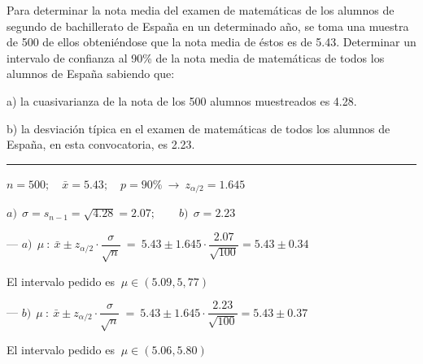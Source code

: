 \vspace{1cm} %
\begin{ejemplo}
\begin{ejre}
Para determinar la nota media del examen de matemáticas de los alumnos de segundo de bachillerato de España en un determinado año, se toma una muestra de 500 de ellos obteniéndose que la nota media de éstos es de 5.43. Determinar un intervalo de confianza al 90\%	de la nota media de matemáticas de todos los alumnos de España sabiendo que:

a) la cuasivarianza de la nota de los 500 alumnos muestreados es 4.28.

b) la desviación típica en el examen de matemáticas de todos los alumnos de España, en esta convocatoria, es 2.23.

\rule{150pt}{0.1pt}

\vspace{2mm} $n=500;\quad \bar x =5.43; \quad p=90\% \ \to \ z_{\alpha/2}=1.645$

\vspace{2mm} $a)\ \ \sigma=s_{n-1}=\sqrt{4.28}=2.07;\qquad b)\ \ \sigma=2.23$

\vspace{2mm} --- $a)\ \ \mu \ : \ 
\bar x \pm z_{\alpha/2} \cdot \dfrac{\sigma}{\sqrt{n}} \ =\ 
5.43\pm 1.645\cdot \dfrac{2.07}{\sqrt{100}}=5.43\pm 0.34$

\vspace{2mm} El intervalo pedido es $\ \mu \in (5.09 , 5,77)$

\vspace{2mm}  --- $b)\ \ \mu \ : \ 
\bar x \pm z_{\alpha/2} \cdot \dfrac{\sigma}{\sqrt{n}} \ =\ 
5.43\pm 1.645\cdot \dfrac{2.23}{\sqrt{100}}=5.43\pm 0.37$

\vspace{2mm} El intervalo pedido es $\ \mu \in ( 5.06 , 5.80)$

\vspace{2mm}

\end{ejre}
\end{ejemplo}
\vspace{0.5mm} %
